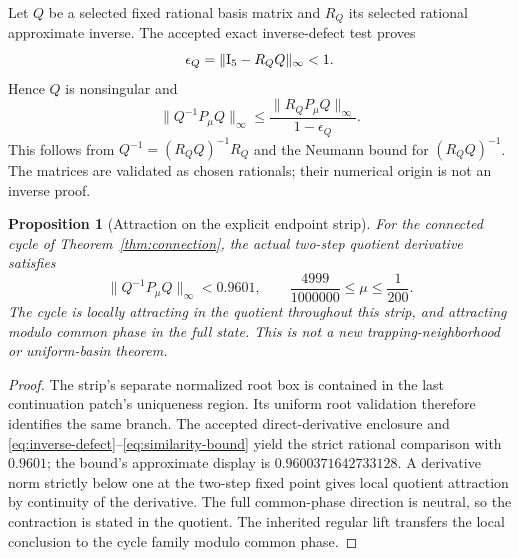 \documentclass[11pt,a4paper]{article}
\numberwithin{equation}{section}
\newtheorem{proposition}[theorem]{Proposition}
\begin{document}
Let $Q$ be a selected fixed rational basis matrix and $R_Q$ its selected rational approximate inverse. The accepted exact inverse-defect test proves
\begin{equation}
\epsilon_Q=\|\mathrm I_5-R_QQ\|_\infty<1.\label{eq:inverse-defect}
\end{equation}
Hence $Q$ is nonsingular and
\begin{equation}
\|Q^{-1}P_\mu Q\|_\infty
\le\frac{\|R_QP_\mu Q\|_\infty}{1-\epsilon_Q}.
\label{eq:similarity-bound}
\end{equation}
This follows from $Q^{-1}=(R_QQ)^{-1}R_Q$ and the Neumann bound for $(R_QQ)^{-1}$. The matrices are validated as chosen rationals; their numerical origin is not an inverse proof.

\begin{proposition}[Attraction on the explicit endpoint strip]\label{prop:stability}
For the connected cycle of Theorem~\ref{thm:connection}, the actual two-step quotient derivative satisfies
\begin{equation}
\|Q^{-1}P_\mu Q\|_\infty<0.9601,\qquad
\frac{4999}{1000000}\le\mu\le\frac1{200}.\label{eq:stability-strip}
\end{equation}
The cycle is locally attracting in the quotient throughout this strip, and attracting modulo common phase in the full state. This is not a new trapping-neighborhood or uniform-basin theorem.
\end{proposition}
\begin{proof}
The strip's separate normalized root box is contained in the last continuation patch's uniqueness region. Its uniform root validation therefore identifies the same branch. The accepted direct-derivative enclosure and \eqref{eq:inverse-defect}--\eqref{eq:similarity-bound} yield the strict rational comparison with $0.9601$; the bound's approximate display is $0.9600371642733128$. A derivative norm strictly below one at the two-step fixed point gives local quotient attraction by continuity of the derivative. The full common-phase direction is neutral, so the contraction is stated in the quotient. The inherited regular lift transfers the local conclusion to the cycle family modulo common phase.
\end{proof}
\end{document}
